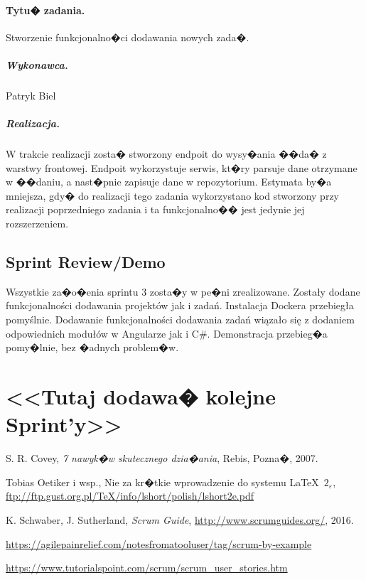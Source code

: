 ﻿\documentclass[a4paper]{article}
\begin{document}
\paragraph{Tytu� zadania.} Stworzenie funkcjonalno�ci dodawania nowych zada�.
\subparagraph{Wykonawca.} Patryk Biel
\subparagraph{Realizacja.} W trakcie realizacji zosta� stworzony endpoit do wysy�ania ��da� z warstwy frontowej. 
Endpoit wykorzystuje serwis, kt�ry parsuje dane otrzymane w ��daniu, a nast�pnie zapisuje dane w repozytorium. Estymata by�a mniejsza, gdy� do realizacji tego zadania wykorzystano kod stworzony przy realizacji poprzedniego zadania i ta funkcjonalno�� jest jedynie jej rozszerzeniem.

\subsection{Sprint Review/Demo}
Wszystkie za�o�enia sprintu 3 zosta�y w pe�ni zrealizowane. Zostały dodane funkcjonalności dodawania projektów jak i zadań. Instalacja Dockera przebiegła pomyślnie. Dodawanie funkcjonalności dodawania zadań wiązało się z dodaniem odpowiednich modułów w Angularze jak i C#. Demonstracja przebieg�a pomy�lnie, bez �adnych problem�w.



\section*{<<Tutaj dodawa� kolejne Sprint'y>>}


\begin{thebibliography}{9}

 S. R. Covey, {\em 7 nawyk�w skutecznego dzia�ania}, Rebis, Pozna�, 2007.

 Tobias Oetiker i wsp., Nie za kr�tkie wprowadzenie do systemu \LaTeX  \ $2_\varepsilon$, \url{ftp://ftp.gust.org.pl/TeX/info/lshort/polish/lshort2e.pdf}

 K. Schwaber, J. Sutherland, {\em Scrum Guide}, \url{http://www.scrumguides.org/}, 2016.

 \url{https://agilepainrelief.com/notesfromatooluser/tag/scrum-by-example}

 \url{https://www.tutorialspoint.com/scrum/scrum_user_stories.htm}

\end{thebibliography}
\end{document}

